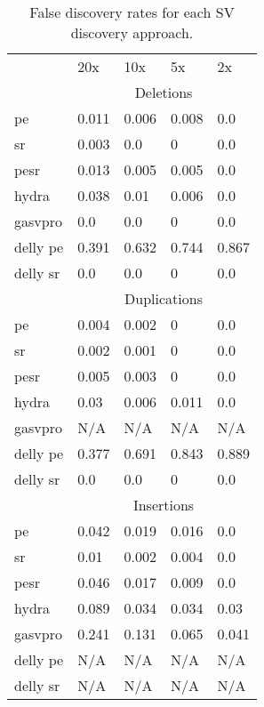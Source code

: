 \documentclass[11pt]{article}
\begin{document}
\begin{table}[h!b!p!]
\caption{False discovery rates for each SV discovery approach.}
\begin{tabular}{l|llll}
			& 20x			& 10x			& 5x			& 2x \\
\cline{2-5}
			& \multicolumn{4}{c}{Deletions} \\
\cline{1-5}
pe			& 0.011			& 0.006		 	& 0.008		 	& 0.0 \\
sr          & 0.003			& 0.0           & 0             & 0.0 \\
pesr        & 0.013			& 0.005		    & 0.005		    & 0.0 \\
hydra       & 0.038			& 0.01		    & 0.006		    & 0.0 \\
gasvpro     & 0.0	        & 0.0           & 0             & 0.0 \\
delly pe    & 0.391			& 0.632		    & 0.744		    & 0.867\\
delly sr    & 0.0	        & 0.0           & 0             & 0.0 \\
\cline{2-5}
			& \multicolumn{4}{c}{Duplications} \\
\cline{2-5}
pe          & 0.004			& 0.002		    & 0             & 0.0 \\
sr          & 0.002			& 0.001		    & 0             & 0.0 \\
pesr        & 0.005			& 0.003		    & 0             & 0.0 \\
hydra       & 0.03			& 0.006		    & 0.011		    & 0.0 \\
gasvpro     & N/A	        & N/A           & N/A           & N/A \\
delly pe    & 0.377			& 0.691		    & 0.843		    & 0.889\\
delly sr    & 0.0	        & 0.0           & 0             & 0.0 \\
\cline{2-5}
			& \multicolumn{4}{c}{Insertions} \\
\cline{2-5}
pe          & 0.042			& 0.019		    & 0.016		    & 0.0 \\
sr          & 0.01			& 0.002			& 0.004		    & 0.0 \\
pesr        & 0.046			& 0.017	        & 0.009		    & 0.0 \\
hydra       & 0.089			& 0.034		    & 0.034		    & 0.03\\
gasvpro     & 0.241			& 0.131		    & 0.065		    & 0.041\\
delly pe    & N/A	        & N/A           & N/A           & N/A \\
delly sr    & N/A	        & N/A           & N/A           & N/A\\

\end{tabular}
\end{table}
\end{document}
